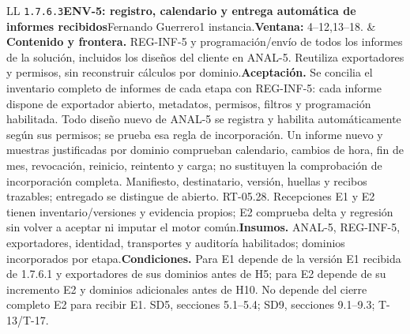 \begin{longtable}{L{\tabcolsep\relax}L{\tabcolsep\relax}}
\texttt{1.\allowbreak{}7.\allowbreak{}6.\allowbreak{}3}\newline{}\textbf{ENV-5: registro, calendario y entrega automática de informes recibidos}\newline{}Fernando Guerrero\newline{}1 instancia.\newline{}\textbf{Ventana:} 4--12,13--18. & \textbf{Contenido y frontera.} REG-INF-5 y programación/envío de todos los informes de la solución, incluidos los diseños del cliente en ANAL-5. Reutiliza exportadores y permisos, sin reconstruir cálculos por dominio.\newline{}\textbf{Aceptación.} Se concilia el inventario completo de informes de cada etapa con REG-INF-5: cada informe dispone de exportador abierto, metadatos, permisos, filtros y programación habilitada. Todo diseño nuevo de ANAL-5 se registra y habilita automáticamente según sus permisos; se prueba esa regla de incorporación. Un informe nuevo y muestras justificadas por dominio comprueban calendario, cambios de hora, fin de mes, revocación, reinicio, reintento y carga; no sustituyen la comprobación de incorporación completa. Manifiesto, destinatario, versión, huellas y recibos trazables; entregado se distingue de abierto. RT-05.28. Recepciones E1 y E2 tienen inventario/versiones y evidencia propios; E2 comprueba delta y regresión sin volver a aceptar ni imputar el motor común.\newline{}\textbf{Insumos.} ANAL-5, REG-INF-5, exportadores, identidad, transportes y auditoría habilitados; dominios incorporados por etapa.\newline{}\textbf{Condiciones.} Para E1 depende de la versión E1 recibida de 1.7.6.1 y exportadores de sus dominios antes de H5; para E2 depende de su incremento E2 y dominios adicionales antes de H10. No depende del cierre completo E2 para recibir E1. SD5, secciones 5.1--5.4; SD9, secciones 9.1--9.3; T-13/T-17.\\\hline

\end{longtable}
